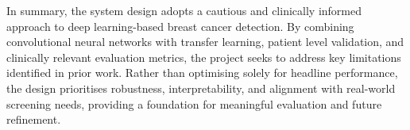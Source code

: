 In summary, the system design adopts a cautious and clinically informed approach to deep learning-based breast cancer detection. By combining convolutional neural networks with transfer learning, patient level validation, and clinically relevant evaluation metrics, the project seeks to address key limitations identified in prior work. Rather than optimising solely for headline performance, the design prioritises robustness, interpretability, and alignment with real-world screening needs, providing a foundation for meaningful evaluation and future refinement.
